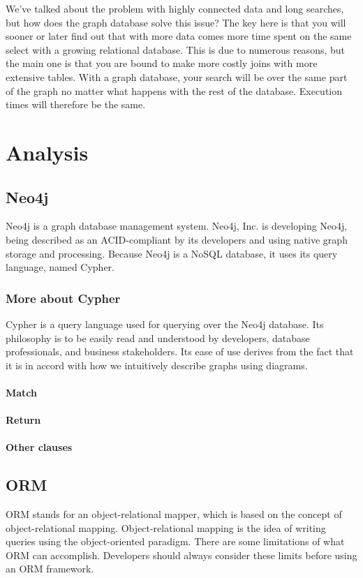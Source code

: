 \documentclass[thesis=M,english]{FITthesis}[2019/12/23]
\begin{document}
We've talked about the problem with highly connected data and long searches, but how does the graph database solve this issue? The key here is that you will sooner or later find out that with more data comes more time spent on the same select with a growing relational database. This is due to numerous reasons, but the main one is that you are bound to make more costly joins with more extensive tables. With a graph database, your search will be over the same part of the graph no matter what happens with the rest of the database. Execution times will therefore be the same.

\chapter {Analysis}

\section{Neo4j}

Neo4j is a graph database management system. Neo4j, Inc. is developing Neo4j, being described as an ACID-compliant by its developers and using native graph storage and processing. Because Neo4j is a NoSQL database, it uses its query language, named Cypher.

\subsection{More about Cypher}

Cypher is a query language used for querying over the Neo4j database. Its philosophy is to be easily read and understood by developers, database professionals, and business stakeholders.  Its ease of use derives from the fact that it is in accord with how we intuitively describe graphs using diagrams. \cite{robinson_graph_2015}

\subsubsection{Match}
\subsubsection{Return}
\subsubsection{Other clauses}

\section{ORM}
ORM stands for an object-relational mapper, which is based on the concept of object-relational mapping. Object-relational mapping is the idea of writing queries using the object-oriented paradigm.
There are some limitations of what ORM can accomplish. Developers should always consider these limits before using an ORM framework. \cite{mario_hoyos_what_2018}
\end{document}

